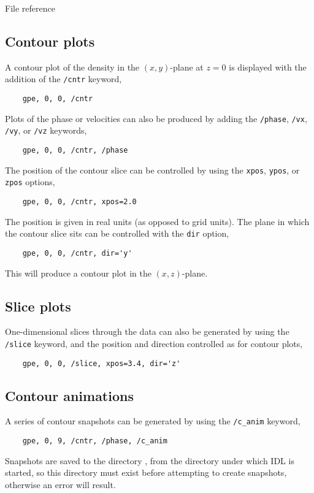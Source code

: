 \begin{chapter}{\label{cha:file_reference}File reference}
  \subsection{Contour plots}
  A contour plot of the density in the $(x,y)$-plane at $z=0$ is displayed with
  the addition of the \verb"/cntr" keyword, \eg
  \begin{Verbatim}
    gpe, 0, 0, /cntr
  \end{Verbatim}
  Plots of the phase or velocities can also be produced by adding the
  \verb"/phase", \verb"/vx", \verb"/vy", or \verb"/vz" keywords, \eg
  \begin{Verbatim}
    gpe, 0, 0, /cntr, /phase
  \end{Verbatim}
  The position of the contour slice can be controlled by using the \verb"xpos",
  \verb"ypos", or \verb"zpos" options, \eg
  \begin{Verbatim}
    gpe, 0, 0, /cntr, xpos=2.0
  \end{Verbatim}
  The position is given in real units (as opposed to grid units).
  The plane in which the contour slice sits can be controlled with the
  \verb"dir" option, \eg
  \begin{Verbatim}
    gpe, 0, 0, /cntr, dir='y'
  \end{Verbatim}
  This will produce a contour plot in the $(x,z)$-plane.

  \subsection{Slice plots}
  One-dimensional slices through the data can also be generated by using the
  \verb"/slice" keyword, and the position and direction controlled as for
  contour plots, \eg
  \begin{Verbatim}
    gpe, 0, 0, /slice, xpos=3.4, dir='z'
  \end{Verbatim}

  \subsection{Contour animations}
  A series of contour snapshots can be generated by using the \verb"/c_anim"
  keyword, \eg
  \begin{Verbatim}
    gpe, 0, 9, /cntr, /phase, /c_anim
  \end{Verbatim}
  Snapshots are saved to the directory , from the directory
  under which IDL is started, so this directory must exist before attempting to
  create snapshots, otherwise an error will result.


\end{chapter}
